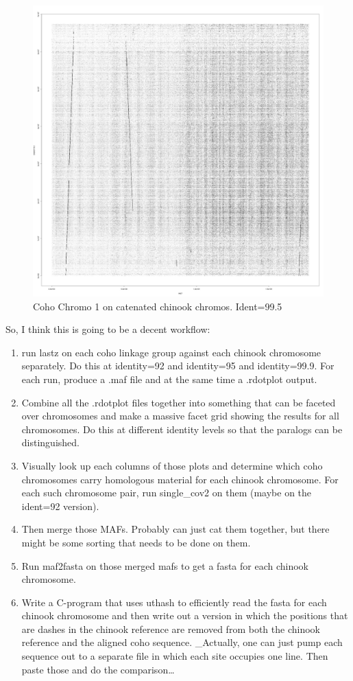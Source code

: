 \documentclass[]{krantz}
\providecommand{\tightlist}{%
  \setlength{\itemsep}{0pt}\setlength{\parskip}{0pt}}
\begin{document}
\begin{figure}
\centering
\includegraphics{figs/quickie.jpg}
\caption{Coho Chromo 1 on catenated chinook chromos. Ident=99.5}
\end{figure}

So, I think this is going to be a decent workflow:

\begin{enumerate}
\def\labelenumi{\arabic{enumi}.}
\tightlist
\item
  run lastz on each coho linkage group against each chinook chromosome separately. Do this at identity=92 and identity=95 and identity=99.9. For each run, produce a .maf file and
  at the same time a .rdotplot output.
\item
  Combine all the .rdotplot files together into something that can be faceted over
  chromosomes and make a massive facet grid showing the results for all chromosomes.
  Do this at different identity levels so that the paralogs can be distinguished.
\item
  Visually look up each columns of those plots and determine which coho chromosomes
  carry homologous material for each chinook chromosome. For each such chromosome pair,
  run single\_cov2 on them (maybe on the ident=92 version).
\item
  Then merge those MAFs. Probably can just cat them together, but there might be some
  sorting that needs to be done on them.
\item
  Run maf2fasta on those merged mafs to get a fasta for each chinook chromosome.
\item
  Write a C-program that uses uthash to efficiently read the fasta for each chinook
  chromosome and then write out a version in which the positions that are dashes in the
  chinook reference are removed from both the chinook reference and the aligned coho
  sequence. \_Actually, one can just pump each sequence out to a separate file in which
  each site occupies one line. Then paste those and do the comparison\ldots{}
\end{enumerate}
\end{document}
